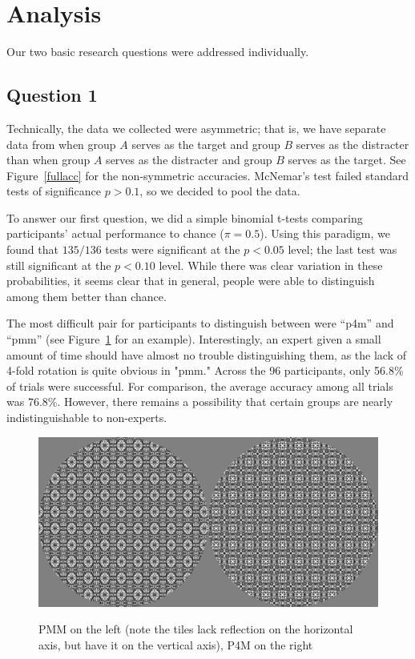 \section{Analysis}
Our two basic research questions were addressed individually.

\subsection{Question 1}
Technically, the data we collected were asymmetric; that is, we have separate data from when group $A$ serves as the target and group $B$ serves as the distracter than when group $A$ serves as the distracter and group $B$ serves as the target. See Figure~\ref{fullacc} for the non-symmetric accuracies. McNemar's test failed standard tests of significance $p > 0.1$, so we decided to pool the data. 

To answer our first question, we did a simple binomial t-tests comparing participants' actual performance to chance ($\pi=0.5$). Using this paradigm, we found that $135/136$ tests were significant at the $p<0.05$ level; the last test was still significant at the $p<0.10$ level. While there was clear variation in these probabilities, it seems clear that in general, people were able to distinguish among them better than chance. 

The most difficult pair for participants to distinguish between were “p4m” and “pmm” (see Figure~\ref{pmmp4m} for an example). Interestingly, an expert given a small amount of time should have almost no trouble distinguishing them, as the lack of 4-fold rotation is quite obvious in "pmm." Across the 96 participants, only 56.8\% of trials were successful. For comparison, the average accuracy among all trials was 76.8\%. However, there remains a possibility that certain groups are nearly indistinguishable to non-experts.

\begin{figure}[!ht]
\centering
\includegraphics[width=0.9\columnwidth]{pmmp4m}
\label{pmmp4m}
\caption{PMM on the left (note the tiles lack reflection on the horizontal axis, but have it on the vertical axis), P4M on the right}
\end{figure}

